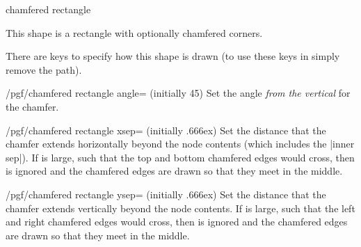 \begin{shape}{chamfered rectangle}

	This shape is a rectangle with optionally chamfered corners.
	
\begin{codeexample}[]
\end{codeexample}

	There are \pgfname{} keys to specify how this shape is drawn (to use
	these keys in \tikzname{} simply remove the  path).

\begin{key}{/pgf/chamfered rectangle angle= (initially 45)}
	Set the angle \emph{from the vertical} for the chamfer.
	
\begin{codeexample}[]
\end{codeexample}
\end{key}

\begin{key}{/pgf/chamfered rectangle xsep= (initially .666ex)}
	Set the distance that the chamfer extends horizontally beyond the node
	contents (which includes the |inner sep|).
	If  is large, such
	that the top and bottom chamfered edges would cross, then
	 is ignored and the chamfered edges are drawn so that
	they meet in the middle.

\begin{codeexample}[]
\end{codeexample}
	
\end{key}

\begin{key}{/pgf/chamfered rectangle ysep= (initially .666ex)}
	Set the distance that the chamfer extends vertically beyond the node
	contents.
	If  is large, such that the left and right chamfered
	edges would cross, then  is ignored and the chamfered
	edges are drawn so that	they meet in the middle.
\end{key}


\end{shape}
